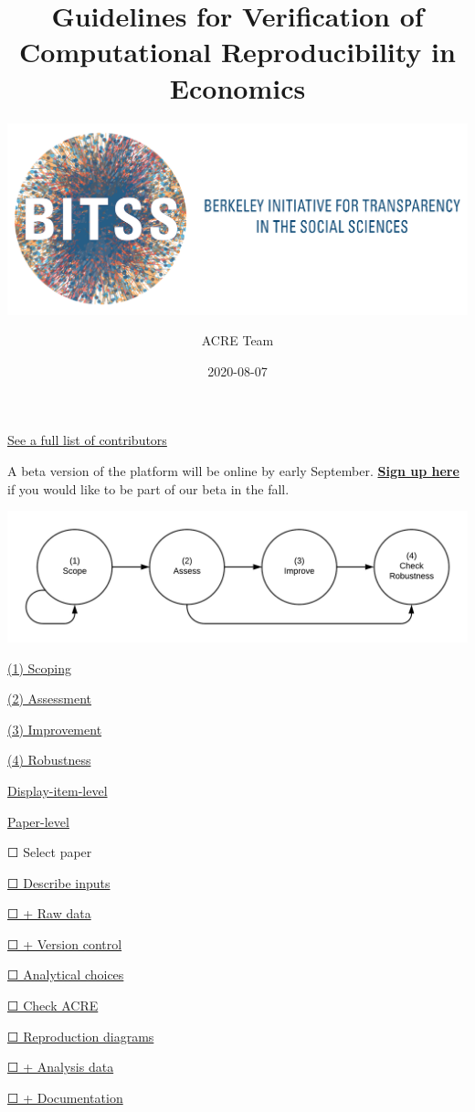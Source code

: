 \documentclass[]{book}
\title{Guidelines for Verification of Computational Reproducibility in Economics}
\subtitle{\href{https://www.bitss.org/}{\includegraphics{BITSS_logo_horizontal.png}}\\}
\author{ACRE Team}
\date{2020-08-07}
\begin{document}
\maketitle

{
\setcounter{tocdepth}{1}
\tableofcontents
}
\hypertarget{section}{%
\chapter*{}\label{section}}

\protect\hyperlink{contributions}{See a full list of contributors}

A beta version of the platform will be online by early September.
\href{https://forms.gle/yZivWcwijCzEhrBU6}{\textbf{Sign up here}} if you would like to be part of our beta in the fall.

\includegraphics[width=1\linewidth]{stages}

\protect\hyperlink{scoping}{(1) Scoping}

\protect\hyperlink{assessment}{(2) Assessment}

\protect\hyperlink{improvements}{(3) Improvement}

\protect\hyperlink{robust}{(4) Robustness}

\protect\hyperlink{di-imp}{Display-item-level}

\protect\hyperlink{paper-level}{Paper-level}

☐ Select paper

\protect\hyperlink{describe-inputs}{☐ Describe inputs}

\protect\hyperlink{rd}{☐ + Raw data}

\protect\hyperlink{paper-level}{☐ + Version control}

\protect\hyperlink{id-analy}{☐ Analytical choices}

\protect\hyperlink{check-acre}{☐ Check ACRE}

\protect\hyperlink{diagram}{☐ Reproduction diagrams}

\protect\hyperlink{ad}{☐ + Analysis data}

\protect\hyperlink{paper-level}{☐ + Documentation}
\end{document}
